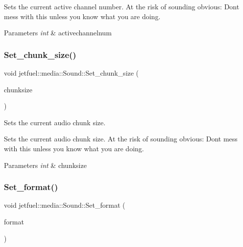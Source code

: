 Sets the current active channel number. At the risk of sounding obvious\+: Don\textquotesingle{}t mess with this unless you know what you are doing.


\begin{DoxyParams}{Parameters}
{\em int} & activechannelnum \\
\hline
\end{DoxyParams}
\mbox{\label{classjetfuel_1_1media_1_1Sound_ad84439e1a101e298b2e5186851ebe0d3}} 
\subsubsection{\texorpdfstring{Set\+\_\+chunk\+\_\+size()}{Set\_chunk\_size()}}
{\footnotesize\ttfamily void jetfuel\+::media\+::\+Sound\+::\+Set\+\_\+chunk\+\_\+size (\begin{DoxyParamCaption}\item[{const int}]{chunksize }\end{DoxyParamCaption})\hspace{0.3cm}{\ttfamily [inline]}}



Sets the current audio chunk size. 

Sets the current audio chunk size. At the risk of sounding obvious\+: Don\textquotesingle{}t mess with this unless you know what you are doing.


\begin{DoxyParams}{Parameters}
{\em int} & chunksize \\
\hline
\end{DoxyParams}
\mbox{\label{classjetfuel_1_1media_1_1Sound_ac764c3156841b6bd2970d912292ac1ca}} 
\subsubsection{\texorpdfstring{Set\+\_\+format()}{Set\_format()}}
{\footnotesize\ttfamily void jetfuel\+::media\+::\+Sound\+::\+Set\+\_\+format (\begin{DoxyParamCaption}\item[{Uint16}]{format }\end{DoxyParamCaption})\hspace{0.3cm}{\ttfamily [inline]}}



